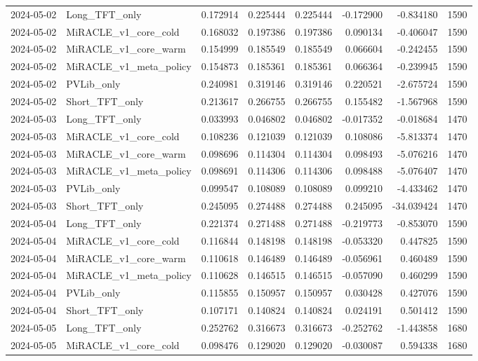 \begin{tabular}{llrrrrrr}
2024-05-02 & Long_TFT_only & 0.172914 & 0.225444 & 0.225444 & -0.172900 & -0.834180 & 1590 \\
2024-05-02 & MiRACLE_v1_core_cold & 0.168032 & 0.197386 & 0.197386 & 0.090134 & -0.406047 & 1590 \\
2024-05-02 & MiRACLE_v1_core_warm & 0.154999 & 0.185549 & 0.185549 & 0.066604 & -0.242455 & 1590 \\
2024-05-02 & MiRACLE_v1_meta_policy & 0.154873 & 0.185361 & 0.185361 & 0.066364 & -0.239945 & 1590 \\
2024-05-02 & PVLib_only & 0.240981 & 0.319146 & 0.319146 & 0.220521 & -2.675724 & 1590 \\
2024-05-02 & Short_TFT_only & 0.213617 & 0.266755 & 0.266755 & 0.155482 & -1.567968 & 1590 \\
2024-05-03 & Long_TFT_only & 0.033993 & 0.046802 & 0.046802 & -0.017352 & -0.018684 & 1470 \\
2024-05-03 & MiRACLE_v1_core_cold & 0.108236 & 0.121039 & 0.121039 & 0.108086 & -5.813374 & 1470 \\
2024-05-03 & MiRACLE_v1_core_warm & 0.098696 & 0.114304 & 0.114304 & 0.098493 & -5.076216 & 1470 \\
2024-05-03 & MiRACLE_v1_meta_policy & 0.098691 & 0.114306 & 0.114306 & 0.098488 & -5.076407 & 1470 \\
2024-05-03 & PVLib_only & 0.099547 & 0.108089 & 0.108089 & 0.099210 & -4.433462 & 1470 \\
2024-05-03 & Short_TFT_only & 0.245095 & 0.274488 & 0.274488 & 0.245095 & -34.039424 & 1470 \\
2024-05-04 & Long_TFT_only & 0.221374 & 0.271488 & 0.271488 & -0.219773 & -0.853070 & 1590 \\
2024-05-04 & MiRACLE_v1_core_cold & 0.116844 & 0.148198 & 0.148198 & -0.053320 & 0.447825 & 1590 \\
2024-05-04 & MiRACLE_v1_core_warm & 0.110618 & 0.146489 & 0.146489 & -0.056961 & 0.460489 & 1590 \\
2024-05-04 & MiRACLE_v1_meta_policy & 0.110628 & 0.146515 & 0.146515 & -0.057090 & 0.460299 & 1590 \\
2024-05-04 & PVLib_only & 0.115855 & 0.150957 & 0.150957 & 0.030428 & 0.427076 & 1590 \\
2024-05-04 & Short_TFT_only & 0.107171 & 0.140824 & 0.140824 & 0.024191 & 0.501412 & 1590 \\
2024-05-05 & Long_TFT_only & 0.252762 & 0.316673 & 0.316673 & -0.252762 & -1.443858 & 1680 \\
2024-05-05 & MiRACLE_v1_core_cold & 0.098476 & 0.129020 & 0.129020 & -0.030087 & 0.594338 & 1680 \\

\end{tabular}

